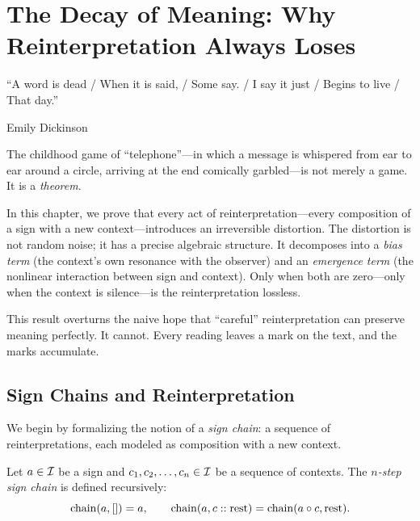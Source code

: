 

\chapter{The Decay of Meaning: Why Reinterpretation Always Loses}
\label{ch:decay}

\epigraph{``A word is dead / When it is said, / Some say. /
I say it just / Begins to live / That day.''}{Emily Dickinson}


The childhood game of ``telephone''---in which a message is whispered
from ear to ear around a circle, arriving at the end comically
garbled---is not merely a game.  It is a \emph{theorem}.

In this chapter, we prove that every act of reinterpretation---every
composition of a sign with a new context---introduces an irreversible
distortion.  The distortion is not random noise; it has a precise
algebraic structure.  It decomposes into a \emph{bias term} (the
context's own resonance with the observer) and an \emph{emergence term}
(the nonlinear interaction between sign and context).  Only when both
are zero---only when the context is silence---is the reinterpretation
lossless.

This result overturns the naive hope that ``careful'' reinterpretation
can preserve meaning perfectly.  It cannot.  Every reading leaves a mark
on the text, and the marks accumulate.

\section{Sign Chains and Reinterpretation}

We begin by formalizing the notion of a \emph{sign chain}: a sequence
of reinterpretations, each modeled as composition with a new context.

\begin{definition}
\label{def:sign-chain}
Let $a \in \mathcal{I}$ be a sign and $c_1, c_2, \ldots, c_n \in \mathcal{I}$ be
a sequence of contexts.  The \emph{$n$-step sign chain} is defined
recursively:
\[
  \mathrm{chain}(a, []) = a, \qquad
  \mathrm{chain}(a, c :: \mathrm{rest}) = \mathrm{chain}(a \circ c, \mathrm{rest}).
\]
\end{definition}

